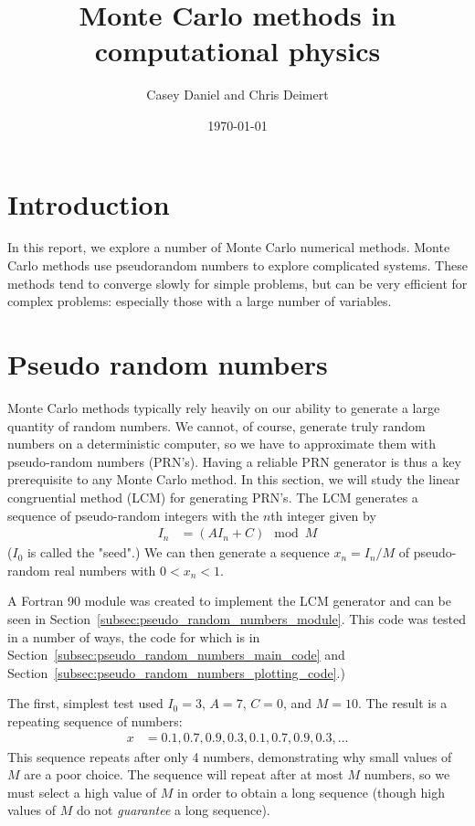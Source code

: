 \documentclass[twocolumn]{myarticle}
\begin{document}
\title{Monte Carlo methods in computational physics}
\author{Casey Daniel and Chris Deimert}
\date{\today}

\maketitle

\section{Introduction}
\label{sec:introduction}

In this report, we explore a number of Monte Carlo numerical methods.
Monte Carlo methods use pseudorandom numbers to explore complicated systems.
These methods tend to converge slowly for simple problems, but can be very efficient for complex problems: especially those with a large number of variables.

\section{Pseudo random numbers}
\label{sec:pseudo_random_numbers}

Monte Carlo methods typically rely heavily on our ability to generate a large quantity of random numbers.
We cannot, of course, generate truly random numbers on a deterministic computer, so we have to approximate them with pseudo-random numbers (PRN's).
Having a reliable PRN generator is thus a key prerequisite to any Monte Carlo method.
In this section, we will study the linear congruential method (LCM) for generating PRN's.
The LCM generates a sequence of pseudo-random integers with the $ n $th integer given by
\begin{align}
    I_{n} &= \left( A I_n + C \right) \! \! \! \! \! \mod M
\end{align}
($ I_0 $ is called the "seed".)
We can then generate a sequence $ x_n = I_n/M $ of pseudo-random real numbers with $ 0 < x_n < 1 $.

A Fortran 90 module was created to implement the LCM generator and can be seen in Section~\ref{subsec:pseudo_random_numbers_module}.
This code was tested in a number of ways, the code for which is in Section~\ref{subsec:pseudo_random_numbers_main_code} and Section~\ref{subsec:pseudo_random_numbers_plotting_code}.)

The first, simplest test used $ I_0 = 3 $, $ A = 7 $, $ C = 0 $, and $ M = 10 $.
The result is a repeating sequence of numbers:
\begin{align}
    x &= 0.1, 0.7, 0.9, 0.3, 0.1, 0.7, 0.9, 0.3, \ldots
\end{align}
This sequence repeats after only 4 numbers, demonstrating why small values of $ M $ are a poor choice.
The sequence will repeat after at most $ M $ numbers, so we must select a high value of $ M $ in order to obtain a long sequence (though high values of $ M $ do not \emph{guarantee} a long sequence).
\end{document}
